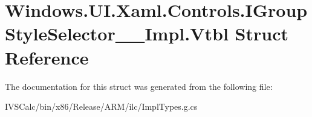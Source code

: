 \hypertarget{struct_windows_1_1_u_i_1_1_xaml_1_1_controls_1_1_i_group_style_selector_____impl_1_1_vtbl}{}\section{Windows.\+U\+I.\+Xaml.\+Controls.\+I\+Group\+Style\+Selector\+\_\+\+\_\+\+Impl.\+Vtbl Struct Reference}
\label{struct_windows_1_1_u_i_1_1_xaml_1_1_controls_1_1_i_group_style_selector_____impl_1_1_vtbl}


The documentation for this struct was generated from the following file\+:\begin{DoxyCompactItemize}
\item 
I\+V\+S\+Calc/bin/x86/\+Release/\+A\+R\+M/ilc/Impl\+Types.\+g.\+cs\end{DoxyCompactItemize}
